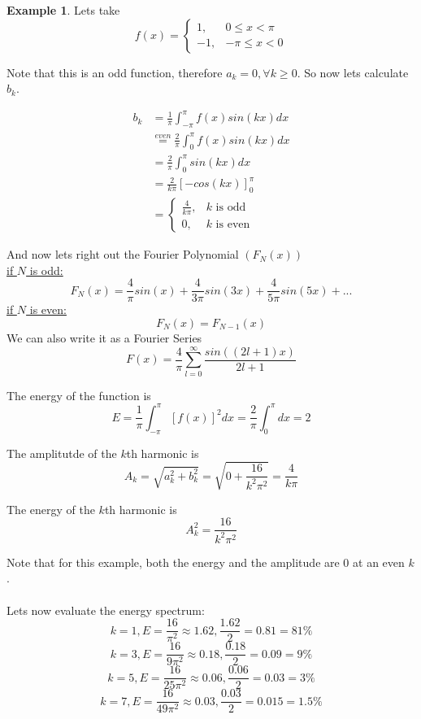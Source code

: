 \documentclass[12pt]{article}
\theoremstyle{plain}
\theoremstyle{definition}
\newtheorem{example}[theorem]{Example}
\begin{document}
\begin{example}
    Lets take
    $$f(x) = \begin{cases}
    1, &0\leq x < \pi\\
    -1, &-\pi \leq x < 0
    \end{cases}$$
    
    Note that this is an odd function, therefore $a_k = 0, \forall k \geq 0$. So now lets calculate $b_k$.
    
    \begin{align*}
        b_k &= \frac{1}{\pi} \int^\pi_{-\pi} f(x)sin(kx) dx\\
        &\overset{even}{=} \frac{2}{\pi} \int^\pi_{0} f(x)sin(kx) dx\\
        &= \frac{2}{\pi} \int^\pi_{0} sin(kx) dx\\
        &= \frac{2}{k\pi} [ -cos(kx) ]^\pi_0\\
        &= \begin{cases}
            \frac{4}{k\pi}, &\text{$k$ is odd}\\
            0, &\text{$k$ is even}
        \end{cases}
    \end{align*}
    
    And now lets right out the Fourier Polynomial $(F_N (x))$\\
    \underline{if $N$ is odd:}
    $$F_N (x) = \frac{4}{\pi}sin(x) + \frac{4}{3\pi}sin(3x) + \frac{4}{5\pi}sin(5x) + ...$$
    \underline{if $N$ is even:}
    $$F_N (x) = F_{N-1} (x)$$
    We can also write it as a Fourier Series
    $$F(x) = \frac{4}{\pi} \sum^\infty_{l=0} \frac{sin((2l+1)x)}{2l+1}$$
    
    The energy of the function is
    $$E = \frac{1}{\pi} \int^\pi_{-\pi} [f(x)]^2 dx = \frac{2}{\pi} \int^\pi_0 dx = 2$$
    
    The amplitutde of the $k$th harmonic is
    $$A_k = \sqrt{a_k^2 + b_k^2} = \sqrt{0 + \frac{16}{k^2\pi^2}} = \frac{4}{k\pi}$$
    
    The energy of the $k$th harmonic is
    $$A_k^2 = \frac{16}{k^2 \pi^2}$$
    
    Note that for this example, both the energy and the amplitude are 0 at an even $k$.\\
    \\
    Lets now evaluate the energy spectrum:
    $$k=1, E= \frac{16}{\pi^2} \approx 1.62, \frac{1.62}{2}=0.81=81\%$$
    $$k=3, E= \frac{16}{9\pi^2} \approx 0.18, \frac{0.18}{2}=0.09=9\%$$
    $$k=5, E= \frac{16}{25\pi^2} \approx 0.06, \frac{0.06}{2}=0.03=3\%$$
    $$k=7, E= \frac{16}{49\pi^2} \approx 0.03, \frac{0.03}{2}=0.015=1.5\%$$
    
\end{example}
\end{document}
